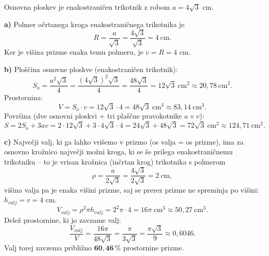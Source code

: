 \documentclass[a4paper,12pt]{letter}
\begin{document}
\begin{resitev}
Osnovna ploskev je enakostrani\v{c}en trikotnik z robom $a=4\sqrt3$ cm.

\textbf{a)} Polmer o\v{c}rtanega kroga enakostrani\v{c}nega trikotnika je
\[
R=\frac{a}{\sqrt3}=\frac{4\sqrt3}{\sqrt3}=4\ \text{cm}.
\]
Ker je vi\v{s}ina prizme enaka temu polmeru, je $v=R=4$ cm.

\textbf{b)} Ploščina osnovne ploskve (enakostrani\v{c}en trikotnik):
\[
S_o=\frac{a^2\sqrt3}{4}=\frac{(4\sqrt3)^2\sqrt3}{4}=\frac{48\sqrt3}{4}=12\sqrt3\ \text{cm}^2\approx20{,}78\ \text{cm}^2.
\]
Prostornina:
\[
V=S_o\cdot v=12\sqrt3\cdot4=48\sqrt3\ \text{cm}^3\approx83{,}14\ \text{cm}^3.
\]
Povr\v{s}ina (dve osnovni ploskvi + tri pla\v{s}\v{c}ne pravokotnike $a\times v$):
\[
S=2S_o+3av=2\cdot12\sqrt3+3\cdot4\sqrt3\cdot4=24\sqrt3+48\sqrt3=72\sqrt3\ \text{cm}^2\approx124{,}71\ \text{cm}^2.
\]

\textbf{c)} Najve\v{c}ji valj, ki ga lahko vri\v{s}emo v prizmo (os valja = os prizme), ima za osnovno kro\v{z}nico najve\v{c}ji mo\v{z}ni kroga, ki se \v{s}e prilega enakostrani\v{c}nemu trikotniku -- to je vrisan kro\v{z}nica (in\v{c}rtan krog) trikotnika s polmerom
\[
\rho=\frac{a}{2\sqrt3}=\frac{4\sqrt3}{2\sqrt3}=2\ \text{cm},
\]
vi\v{s}ina valja pa je enaka vi\v{s}ini prizme, saj se prerez prizme ne spreminja po vi\v{s}ini: $h_{valj}=v=4$ cm.
\[
V_{valj}=\rho^2\pi h_{valj}=2^2\pi\cdot4=16\pi\ \text{cm}^3\approx50{,}27\ \text{cm}^3.
\]
Dele\v{z} prostornine, ki jo zavzame valj:
\[
\frac{V_{valj}}{V}=\frac{16\pi}{48\sqrt3}=\frac{\pi}{3\sqrt3}=\frac{\pi\sqrt3}{9}\approx0{,}6046.
\]
Valj torej zavzema pribli\v{z}no $\boldsymbol{60{,}46\,\%}$ prostornine prizme.
\end{resitev}
\end{document}
